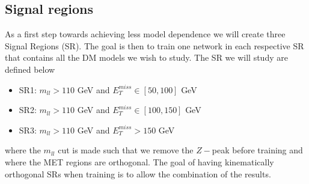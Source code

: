 \documentclass[12pt, a4paper]{book}
\begin{document}
\subsection{Signal regions}\label{sec:SRs}
As a first step towards achieving less model dependence we will create three Signal Regions (SR). The goal is then to train one network in each respective SR that contains all the DM models we wish to study. The SR we will study are defined below 
\begin{itemize}
   \item SR1: $m_{ll} >110$ GeV and $E_T^{miss} \in [50, 100]$ GeV
   \item SR2: $m_{ll} >110$ GeV and $E_T^{miss} \in [100, 150]$ GeV
   \item SR3: $m_{ll} >110$ GeV and $E_T^{miss} >150$ GeV
\end{itemize}
where the $m_{ll}$ cut is made such that we remove the $Z-$peak before training and where the MET regions are orthogonal. 
The goal of having kinematically orthogonal SRs when training is to allow the combination of the results.
\end{document}
